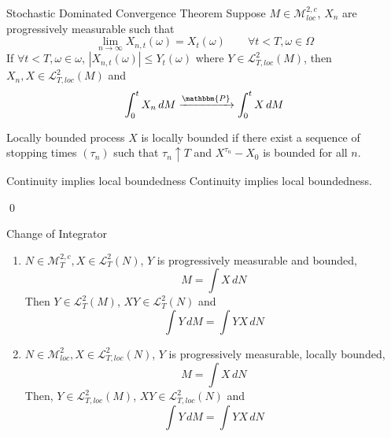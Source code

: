 \documentclass[12pt,a4paper]{article}
\renewenvironment{proof}
    {\begin{trivlist}\item[\hskip\labelsep\color{blue}\bfseries Proof:]}
    {\qed\end{trivlist}}
\begin{document}
\pagebreak
\begin{theorem}{Stochastic Dominated Convergence Theorem}{}
    Suppose $M\in\mathcal{M}^{2,c}_{loc}$, $X_n$ are progressively measurable such that
    $$
    \lim_{n\to\infty} X_{n,t}(\omega) = X_t(\omega)\qquad\forall t<T, \omega\in\Omega
    $$
    If $\forall t<T, \omega\in\omega$, $|X_{n,t}(\omega)|\le Y_t(\omega)$ where $Y\in\mathcal{L}^2_{T,loc}(M)$, then $X_n,X\in\mathcal{L}^2_{T,loc}(M)$ and
    $$
    \int_0^t X_n\, dM\xrightarrow{\mathbbm{P}} \int_0^t X\, dM
    $$
\end{theorem}
\begin{definition}{Locally bounded process}{}
    $X$ is locally bounded if there exist a sequence of stopping times $(\tau_n)$ such that $\tau_n\uparrow T$ and $X^{\tau_n}-X_0$ is bounded for all $n$.
\end{definition}
\begin{proposition}{Continuity implies local boundedness}{}
    Continuity implies local boundedness.
\end{proposition}
\begin{proof}
    
\end{proof}
\pagebreak
\begin{theorem}{Change of Integrator}{}
    \begin{enumerate}
        \item[1)] $N\in\mathcal{M}_{T}^{2,c}, X\in\mathcal{L}^2_T(N)$, $Y$ is progressively measurable and bounded, 
        $$M = \int X\,dN$$
        Then $Y\in\mathcal{L}^2_T(M)$, $XY\in\mathcal{L}^2_T(N)$ and 
        $$\int Y\,dM = \int YX\, dN$$
        \item[2)] $N\in\mathcal{M}^2_{loc}, X\in\mathcal{L}^2_{T,loc}(N)$, $Y$ is progressively measurable, locally bounded,
        $$
        M = \int X\,dN
        $$
        Then, $Y\in\mathcal{L}^2_{T,loc}(M)$, $XY\in\mathcal{L}^2_{T,loc}(N)$ and
        $$
        \int Y\, dM = \int YX\, dN
        $$
    \end{enumerate}
\end{theorem}
\end{document}
